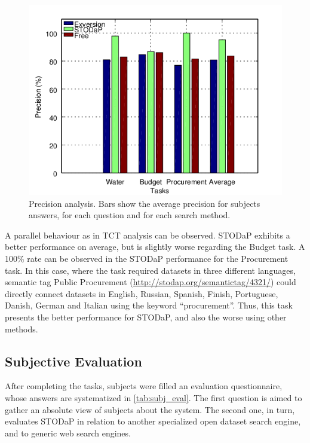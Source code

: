 \begin{figure}[h!]
\begin{center}
\includegraphics[width=\columnwidth]{images/precision.png}
\caption[Precision analysis.]{Precision analysis. Bars show the average precision for subjects answers, for each question and for each search method.}
\label{fig:precision}
\end{center}
\end{figure}

A parallel behaviour as in TCT analysis can be observed.
STODaP exhibits a better performance on average, but is slightly worse regarding the Budget task.
A 100\% rate can be observed in the STODaP performance for the Procurement task.
In this case, where the task required datasets in three different languages, semantic tag Public Procurement (\url{http://stodap.org/semantictag/4321/}) could directly connect datasets in English, Russian, Spanish, Finish, Portuguese, Danish, German and Italian using the keyword ``procurement''.
Thus, this task presents the better performance for STODaP, and also the worse using other methods.

\subsection{Subjective Evaluation}

After completing the tasks, subjects were filled an evaluation questionnaire, whose answers are systematized in \autoref{tab:subj_eval}.
The first question is aimed to gather an absolute view of subjects about the system.
The second one, in turn, evaluates STODaP in relation to another specialized open dataset search engine, and to generic web search engines.

